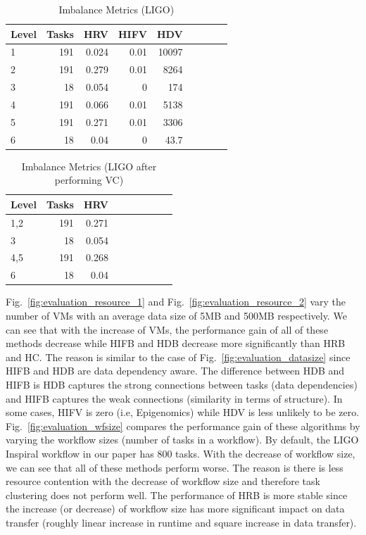 \begin{table}[!htb]
\caption{Imbalance Metrics (LIGO)}
\label{tab:evaluation_ligo}
\centering
\begin{tabular}{lrrrrrrrr}
\hline
Level & Tasks & HRV &  HIFV & HDV  \\

\hline
1 & 191 & 0.024 & 0.01 & 10097 \\
2 & 191 & 0.279 & 0.01 & 8264\\
3 & 18 & 0.054 & 0 & 174\\
4 & 191 & 0.066 & 0.01 & 5138\\
5 & 191 & 0.271 & 0.01 & 3306\\
6 & 18 &  0.04 & 0 & 43.7\\

\hline
\end{tabular}
\end{table} 


\begin{table}[!htb]
\caption{Imbalance Metrics (LIGO after performing VC)}
\label{tab:evaluation_ligo_vc}
\centering
\begin{tabular}{lrrrrrrrr}
\hline
Level & Tasks & HRV   \\

\hline
1,2 & 191 & 0.271  \\
3 & 18 & 0.054 \\
4,5 & 191 & 0.268 \\
6 & 18 &  0.04 \\

\hline
\end{tabular}
\end{table} 


Fig.~\ref{fig:evaluation_resource_1} and Fig.~\ref{fig:evaluation_resource_2} vary the number of VMs with an average data size of 5MB and 500MB respectively. We can see that with the increase of VMs, the performance gain of all of these methods decrease while HIFB and HDB decrease more significantly than HRB and HC. The reason is similar to the case of Fig.~\ref{fig:evaluation_datasize} since HIFB and HDB are data dependency aware. The difference between HDB and HIFB is HDB captures the strong connections between tasks (data dependencies) and HIFB captures the weak connections (similarity in terms of structure). In some cases, HIFV is zero (i.e, Epigenomics) while HDV is less unlikely to be zero. Fig.~\ref{fig:evaluation_wfsize} compares the performance gain of these algorithms by varying the workflow sizes (number of tasks in a workflow). By default, the LIGO Inspiral workflow in our paper has 800 tasks. With the decrease of workflow size, we can see that all of these methods perform worse. The reason is there is less resource contention with the decrease of workflow size and therefore task clustering does not perform well. The performance of HRB is more stable since the increase (or decrease) of workflow size has more significant impact on data transfer (roughly linear increase in runtime and square increase in data transfer). 

